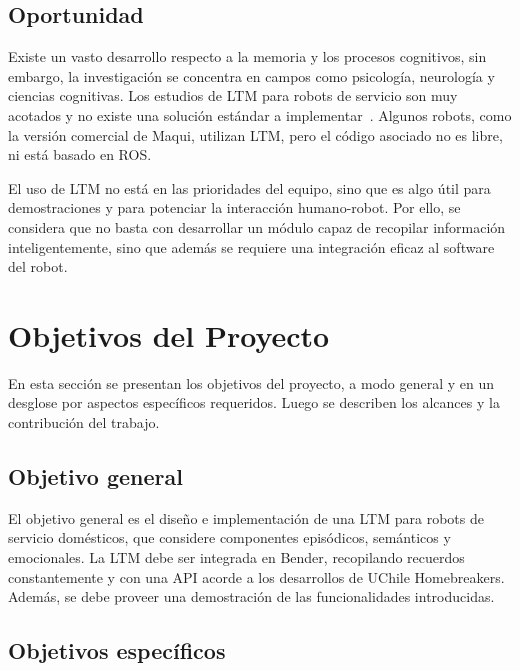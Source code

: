 \subsection{Oportunidad}

Existe un vasto desarrollo respecto a la memoria y los procesos cognitivos, sin embargo, la investigación se concentra en campos como psicología, neurología y ciencias cognitivas. Los estudios de LTM para robots de servicio son muy acotados y no existe una solución estándar a implementar~\cite{ltm_in_robocup}. Algunos robots, como la versión comercial de Maqui, utilizan LTM, pero el código asociado no es libre, ni está basado en ROS.

El uso de LTM no está en las prioridades del equipo, sino que es algo útil para demostraciones y para potenciar la interacción humano-robot. Por ello, se considera que no basta con desarrollar un módulo capaz de recopilar información inteligentemente, sino que además se requiere una integración eficaz al software del robot.


\section{Objetivos del Proyecto}\label{sec:objetivos}

En esta sección se presentan los objetivos del proyecto, a modo general y en un desglose por aspectos específicos requeridos. Luego se describen los alcances y la contribución del trabajo. 

\subsection{Objetivo general}

El objetivo general es el diseño e implementación de una LTM para robots de servicio domésticos, que considere componentes episódicos, semánticos y emocionales. La LTM debe ser integrada en Bender, recopilando recuerdos constantemente y con una API acorde a los desarrollos de UChile Homebreakers. Además, se debe proveer una demostración de las funcionalidades introducidas.


\subsection{Objetivos específicos}

